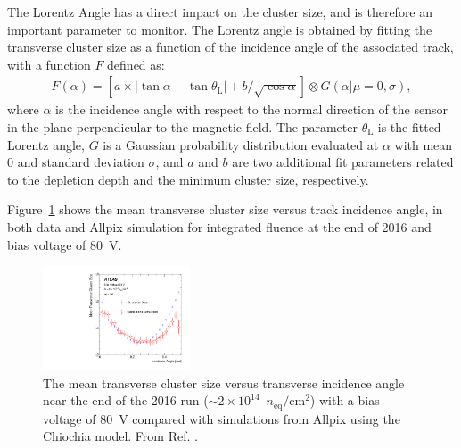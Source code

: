 The Lorentz Angle has a direct impact on the cluster size, and is therefore an important parameter to monitor. The Lorentz angle is obtained by fitting the transverse cluster size as a function of the incidence angle of the associated track, with a function $F$ defined as:
\begin{align}
F(\alpha)=[a\times |\tan\alpha-\tan\theta_{\text{L}}|+b/\sqrt{\cos\alpha}]\otimes G(\alpha|\mu=0,\sigma),
\label{eq:F_LA}
\end{align}
where $\alpha$ is the incidence angle with respect to the normal direction of the sensor in the plane perpendicular to the magnetic field. The parameter $\theta_{\text{L}}$ is the fitted Lorentz angle, $G$ is a Gaussian probability distribution evaluated at $\alpha$ with mean $0$ and standard deviation $\sigma$, and $a$ and $b$ are two additional fit parameters related to the depletion depth and the minimum cluster size, respectively. 

Figure~\ref{fig:LA2:Run2} shows the mean transverse cluster size versus track incidence angle, in both data and Allpix 
simulation for integrated fluence at the end of 2016 and bias voltage of 80~V.



\begin{figure}[h!]
\centering
  \includegraphics[width=0.39\textwidth]{figures/SensorSimulation/arXivversion_fig_22a.pdf}
  \caption{The mean transverse cluster size versus transverse incidence angle near the end of the 2016 run ($\sim2\times 10^{14}$~$ n_{\textrm{eq}}/\textrm{cm}^2$) with a bias voltage of 80~V compared with simulations from Allpix using the Chiochia model. From Ref. \cite{Aaboud:2019wgd}.}
\label{fig:LA2:Run2}
\end{figure}

